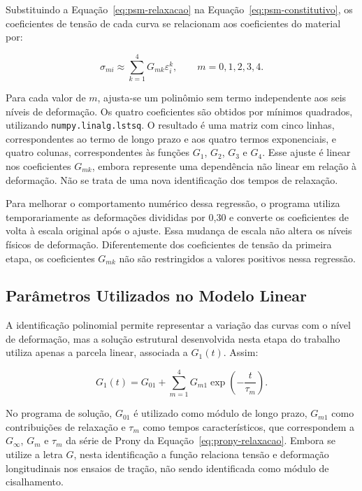\documentclass[arial,centeredequations,english,brazilian,oneside,section=TITLE]{ifes8}
\begin{document}
Substituindo a Equação~\eqref{eq:psm-relaxacao} na
Equação~\eqref{eq:psm-constitutivo}, os coeficientes de tensão de cada curva se relacionam
aos coeficientes do material por:

\begin{equation}
  \label{eq:regressao-coeficientes-material}
  \sigma_{mi}\approx\sum_{k=1}^{4}G_{mk}\varepsilon_i^k,
  \qquad m=0,1,2,3,4.
\end{equation}

Para cada valor de $m$, ajusta-se um polinômio sem termo independente aos seis níveis de
deformação. Os quatro coeficientes são obtidos por mínimos quadrados, utilizando
\texttt{numpy.linalg.lstsq}. O resultado é uma matriz com cinco linhas, correspondentes
ao termo de longo prazo e aos quatro termos exponenciais, e quatro colunas, correspondentes
às funções $G_1$, $G_2$, $G_3$ e $G_4$.
Esse ajuste é linear nos coeficientes $G_{mk}$, embora represente uma dependência
não linear em relação à deformação. Não se trata de uma nova identificação
dos tempos de relaxação.

Para melhorar o comportamento numérico dessa regressão, o programa utiliza temporariamente
as deformações divididas por 0,30 e converte os coeficientes de volta à escala original após
o ajuste. Essa mudança de escala não altera os níveis físicos de deformação. Diferentemente
dos coeficientes de tensão da primeira etapa, os coeficientes $G_{mk}$ não são restringidos
a valores positivos nessa regressão.

\subsection{Parâmetros Utilizados no Modelo Linear}
\label{sec:parametros-material-linear}

A identificação polinomial permite representar a variação das curvas com o nível de
deformação, mas a solução estrutural desenvolvida nesta etapa do trabalho utiliza apenas
a parcela linear, associada a $G_1(t)$. Assim:

\begin{equation}
  \label{eq:relaxacao-material-linear}
  G_1(t)=G_{01}
  +\sum_{m=1}^{4}G_{m1}\exp\left(-\frac{t}{\tau_m}\right).
\end{equation}

No programa de solução, $G_{01}$ é utilizado como módulo de longo prazo, $G_{m1}$ como
contribuições de relaxação e $\tau_m$ como tempos característicos, que correspondem a $G_{\infty}$, $G_m$ e $\tau_m$
da série de Prony da Equação~\eqref{eq:prony-relaxacao}. Embora se utilize a letra
$G$, nesta identificação a função relaciona tensão e deformação longitudinais nos ensaios
de tração, não sendo identificada como módulo de cisalhamento.
\end{document}
